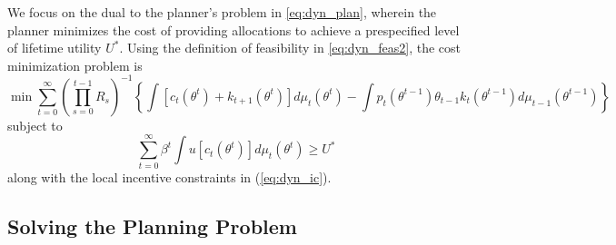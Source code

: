 \documentclass[11pt]{article}
\begin{document}
We focus on the dual to the planner's problem in \eqref{eq:dyn_plan}, wherein the planner minimizes the cost of providing allocations to achieve a prespecified level of lifetime utility \( U^* \). Using the definition of feasibility in \eqref{eq:dyn_feas2}, the cost minimization problem is 
\begin{equation}
    \min\sum_{t=0}^{\infty}\left(\prod_{s=0}^{t-1}R_{s}\right)^{-1}\left\{ \int\left[c_{t}\left(\theta^{t}\right)+k_{t+1}\left(\theta^{t}\right)\right]d\mu_{t}\left(\theta^{t}\right)-\int p_{t}\left(\theta^{t-1}\right)\theta_{t-1}k_{t}\left(\theta^{t-1}\right)d\mu_{t-1}\left(\theta^{t-1}\right)\right\} \label{eq:cost_obj}
\end{equation}
subject to 
\begin{equation}
    \sum_{t=0}^{\infty}\beta^{t}\int u\left[c_{t}\left(\theta^{t}\right)\right]d\mu_{t}\left(\theta^{t}\right)\ge U^{*}\label{eq:cost_constr}
\end{equation}
along with the local incentive constraints in (\ref{eq:dyn_ic}).

\subsection{Solving the Planning Problem}
\end{document}
